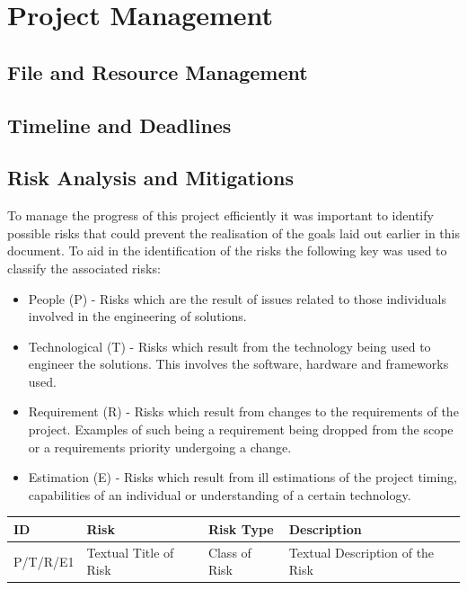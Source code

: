 \documentclass[12pt]{article}  %
\theoremstyle{definition}
\theoremstyle{remark}
\begin{document}
\newpage                     %
\section{Project Management}\label{ss:back}

\subsection {File and Resource Management}

\subsection {Timeline and Deadlines}

\subsection {Risk Analysis and Mitigations}

To manage the progress of this project efficiently it was important to identify possible risks that could prevent the realisation of the goals laid out earlier in this document. To aid in the identification of the risks the following key was used to classify the associated risks:
\begin{itemize}
\item{People (P) - Risks which are the result of issues related to those individuals involved in the engineering of solutions.}
\item{Technological (T) - Risks which result from the technology being used to engineer the solutions. This involves the software, hardware and frameworks used.}
\item{Requirement (R)  - Risks which result from changes to the requirements of the project. Examples of such being a requirement being dropped from the scope or a requirements priority undergoing a change.}
\item{Estimation (E) - Risks which result from ill estimations of the project timing, capabilities of an individual or understanding of a certain technology.}
\end{itemize}

\begin{tabularx}{1.1\textwidth} {
	|  >{\center\arraybackslash}X
	| >{\center\arraybackslash}X
	| >{\center\arraybackslash}X
	| >{\center\arraybackslash} X | }
	\hline
	ID & Risk & Risk Type & Description \\
	\hline
	P/T/R/E1 & Textual Title of Risk & Class of Risk & Textual Description of the Risk \\
	\hline
\end{tabularx}
\end{document}
